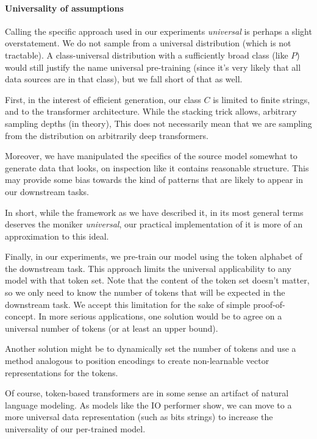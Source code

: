 \documentclass{article} %
\begin{document}
\paragraph{Universality of assumptions} Calling the specific approach used in our experiments \emph{universal} is perhaps a slight overstatement. We do not sample from a universal distribution (which is not tractable). A class-universal distribution with a sufficiently broad class (like $P$) would still justify the name universal pre-training (since it's very likely that all data sources are in that class), but we fall short of that as well.

First, in the interest of efficient generation, our class $C$ is limited to finite strings, and to the transformer architecture. While the stacking trick allows, arbitrary sampling depths (in theory), This does not necessarily mean that we are sampling from the distribution on arbitrarily deep transformers. 

Moreover, we have manipulated the specifics of the source model somewhat to generate data that looks, on inspection like it contains reasonable structure. This may provide some bias towards the kind of patterns that are likely to appear in our downstream tasks. 

In short, while the framework as we have described it, in its most general terms deserves the moniker \emph{universal}, our practical implementation of it is more of an approximation to this ideal.

Finally, in our experiments, we pre-train our model using the token alphabet of the downstream task. This approach limits the universal applicability to any model with that token set. Note that the content of the token set doesn't matter, so we only need to know the number of tokens that will be expected in the downstream task. We accept this limitation for the sake of simple proof-of-concept. In more serious applications, one solution would be to agree on a universal number of tokens (or at least an upper bound). 

Another solution might be to dynamically set the number of tokens and use a method analogous to position encodings to create non-learnable vector representations for the tokens.

Of course, token-based transformers are in some sense an artifact of natural language modeling. As models like the IO performer show, we can move to a more universal data representation (such as bits strings) to increase the universality of our per-trained model.
\end{document}
